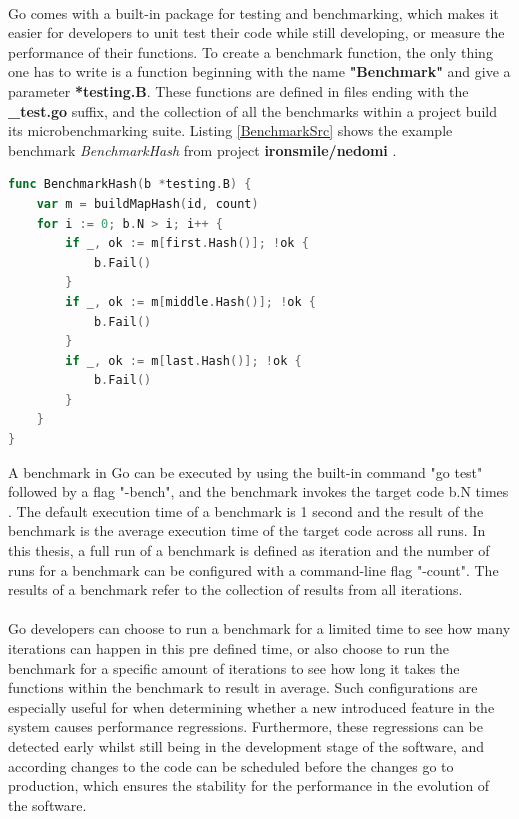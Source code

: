 \documentclass{seal_thesis}
\begin{document}
\\
Go comes with a built-in package for testing and benchmarking, which makes it easier for developers to unit test their code while still developing, or measure the performance of their functions\cite{gobench}. To create a benchmark function, the only thing one has to write is a function beginning with the name \textbf{"Benchmark"} and give a parameter \textbf{*testing.B}. These functions are defined in files ending with the \textbf{\_test.go} suffix, and the collection of all the benchmarks within a project build its microbenchmarking suite. Listing \ref{BenchmarkSrc} shows the example benchmark \textit{BenchmarkHash} from project \textbf{ironsmile/nedomi} \cite{ironsmile/nedomi}.

\begin{lstlisting}[caption=An example benchmark from \cite{ironsmile/nedomi}., label={BenchmarkSrc}, language=Go, frame=single, breaklines=false]
func BenchmarkHash(b *testing.B) {
	var m = buildMapHash(id, count)
	for i := 0; b.N > i; i++ {
		if _, ok := m[first.Hash()]; !ok {
			b.Fail()
		}
		if _, ok := m[middle.Hash()]; !ok {
			b.Fail()
		}
		if _, ok := m[last.Hash()]; !ok {
			b.Fail()
		}
	}
}
\end{lstlisting}

\noindent A benchmark in Go can be executed by using the built-in command "go test" followed by a flag "-bench", and the benchmark invokes the target code b.N times \cite{gobench}. The default execution time of a benchmark is 1 second and the result of the benchmark is the average execution time of the target code across all runs. In this thesis, a full run of a benchmark is defined as iteration and the number of runs for a benchmark can be configured with a command-line flag "-count". The results of a benchmark refer to the collection of results from all iterations.\\
\\
Go developers can choose to run a benchmark for a limited time to see how many iterations can happen in this pre defined time, or also choose to run the benchmark for a specific amount of iterations to see how long it takes the functions within the benchmark to result in average. Such configurations are especially useful for when determining whether a new introduced feature in the system causes performance regressions. Furthermore, these regressions can be detected early whilst still being in the development stage of the software, and according changes to the code can be scheduled before the changes go to production, which ensures the stability for the performance in the evolution of the software.
\end{document}
